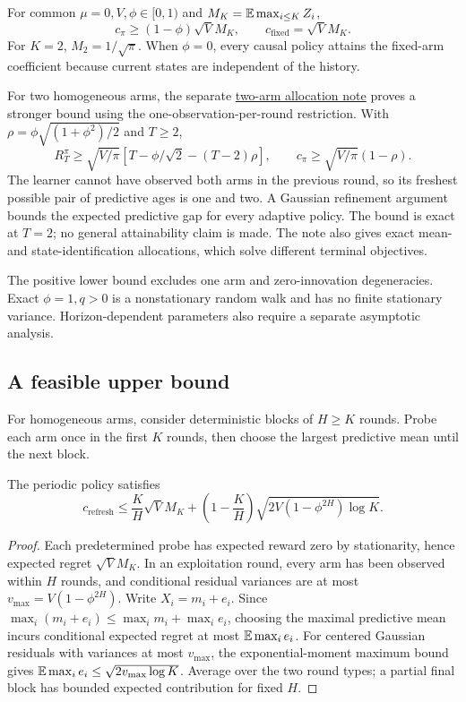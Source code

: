 \begin{corollary}
For common $\mu=0,V,\phi\in[0,1)$ and $M_K=\mathbb E\max_{i\leq K}Z_i$,
\begin{equation}
c_\pi\geq(1-\phi)\sqrt V M_K,
\qquad c_{\mathrm{fixed}}=\sqrt V M_K.
\end{equation}
For $K=2$, $M_2=1/\sqrt\pi$. When $\phi=0$, every causal policy attains the fixed-arm coefficient because current states are independent of the history.

For two homogeneous arms, the separate \href{../two_arm_ar1/manuscript.pdf}{two-arm allocation note} proves a stronger bound using the one-observation-per-round restriction. With $\rho=\phi\sqrt{(1+\phi^2)/2}$ and $T\geq2$,
\[
R_T^\pi\geq\sqrt{V/\pi}\left[T-\phi/\sqrt2-(T-2)\rho\right],
\qquad c_\pi\geq\sqrt{V/\pi}(1-\rho).
\]
The learner cannot have observed both arms in the previous round, so its freshest possible pair of predictive ages is one and two. A Gaussian refinement argument bounds the expected predictive gap for every adaptive policy. The bound is exact at $T=2$; no general attainability claim is made. The note also gives exact mean- and state-identification allocations, which solve different terminal objectives.
\end{corollary}
The positive lower bound excludes one arm and zero-innovation degeneracies. Exact $\phi=1,q>0$ is a nonstationary random walk and has no finite stationary variance. Horizon-dependent parameters also require a separate asymptotic analysis.

\subsection{A feasible upper bound}
For homogeneous arms, consider deterministic blocks of $H\geq K$ rounds. Probe each arm once in the first $K$ rounds, then choose the largest predictive mean until the next block.

\begin{proposition}
The periodic policy satisfies
\begin{equation}
c_{\mathrm{refresh}}\leq
\frac K H\sqrt V M_K+
\left(1-\frac K H\right)\sqrt{2V(1-\phi^{2H})\log K}.
\label{predictive_ar1:eq:upper}
\end{equation}
\end{proposition}
\begin{proof}
Each predetermined probe has expected reward zero by stationarity, hence expected regret $\sqrt V M_K$. In an exploitation round, every arm has been observed within $H$ rounds, and conditional residual variances are at most $v_{\max}=V(1-\phi^{2H})$. Write $X_i=m_i+e_i$. Since $\max_i(m_i+e_i)\leq\max_i m_i+\max_i e_i$, choosing the maximal predictive mean incurs conditional expected regret at most $\mathbb E\max_i e_i$. For centered Gaussian residuals with variances at most $v_{\max}$, the exponential-moment maximum bound gives $\mathbb E\max_i e_i\leq\sqrt{2v_{\max}\log K}$. Average over the two round types; a partial final block has bounded expected contribution for fixed $H$.
\end{proof}

